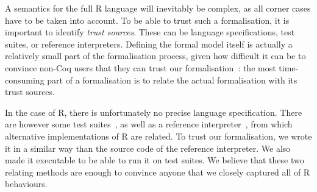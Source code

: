\documentclass[9pt, sigplan, natbib=false, screen=true]{acmart}
\newcommand\Coq{Coq}
\newcommand\R{R}
\begin{document}
A semantics for the full \R{} language will inevitably
be complex, as all corner cases have to be taken into account.
%
To be able to trust such a formalisation,
it is important to identify \emph{trust sources}.
These can be language specifications,
test suites,
or reference interpreters.
%
Defining the formal model itself
is actually a relatively small part of the formalisation process,
given how difficult it can be to convince non-\Coq{} users
that they can trust our formalisation~\parencite{leroy2014pip}:
the most time-consuming part of a formalisation is to
relate the actual formalisation with its trust sources.




In the case of \R{}, there is unfortunately
no precise language specification.
There are however some test suites~\parencite{2014testr, maj2013testr},
as well as a reference interpreter~\parencite{Rwebsite},
from which alternative implementations of \R{} are related.
%
To trust our formalisation, we wrote it in a similar
way than the source code of the reference interpreter.
We also made it executable to be able to run it on test suites.
We believe that these two relating methods are enough
to convince anyone that we closely captured all of \R{} behaviours.
\end{document}
